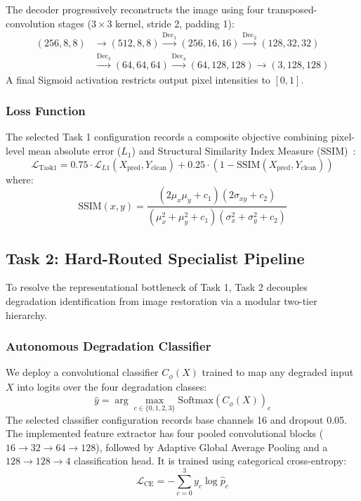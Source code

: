 \documentclass[journal,compsoc]{IEEEtran}
\begin{document}
The decoder progressively reconstructs the image using four transposed-convolution stages ($3 \times 3$ kernel, stride 2, padding 1):
\begin{equation}
\begin{aligned}
    (256, 8, 8) &\to (512,8,8) \xrightarrow{\text{Dec}_1} (256, 16, 16) \xrightarrow{\text{Dec}_2} (128, 32, 32) \\
    &\xrightarrow{\text{Dec}_3} (64, 64, 64) \xrightarrow{\text{Dec}_4} (64,128,128) \to (3,128,128)
\end{aligned}
\end{equation}
A final Sigmoid activation restricts output pixel intensities to $[0, 1]$.

\subsubsection{Loss Function}
The selected Task 1 configuration records a composite objective combining pixel-level mean absolute error ($L_1$) and Structural Similarity Index Measure (SSIM)~\cite{wang2004image}:
\begin{equation}
    \mathcal{L}_{\text{Task1}} = 0.75 \cdot \mathcal{L}_{L1}(X_{\text{pred}}, Y_{\text{clean}}) + 0.25 \cdot (1 - \text{SSIM}(X_{\text{pred}}, Y_{\text{clean}}))
\end{equation}
where:
\begin{equation}
    \text{SSIM}(x, y) = \frac{(2\mu_x\mu_y + c_1)(2\sigma_{xy} + c_2)}{(\mu_x^2 + \mu_y^2 + c_1)(\sigma_x^2 + \sigma_y^2 + c_2)}
\end{equation}

\subsection{Task 2: Hard-Routed Specialist Pipeline}
To resolve the representational bottleneck of Task 1, Task 2 decouples degradation identification from image restoration via a modular two-tier hierarchy.

\subsubsection{Autonomous Degradation Classifier}
We deploy a convolutional classifier $C_\phi(X)$ trained to map any degraded input $X$ into logits over the four degradation classes:
\begin{equation}
    \hat{y} = \arg\max_{c \in \{0, 1, 2, 3\}} \text{Softmax}(C_\phi(X))_c
\end{equation}
The selected classifier configuration records base channels 16 and dropout 0.05. The implemented feature extractor has four pooled convolutional blocks ($16\to32\to64\to128$), followed by Adaptive Global Average Pooling and a $128\to128\to4$ classification head. It is trained using categorical cross-entropy:
\begin{equation}
    \mathcal{L}_{\text{CE}} = -\sum_{c=0}^3 y_c \log \hat{p}_c
\end{equation}
\end{document}
